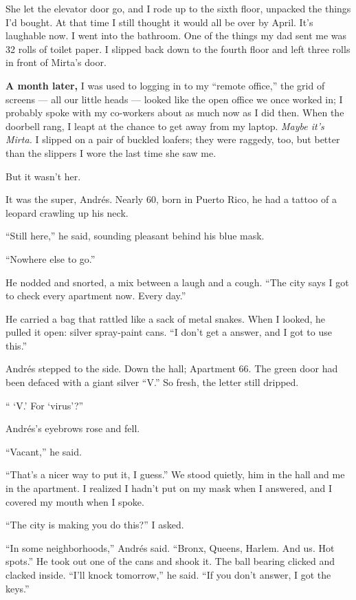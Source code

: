 She let the elevator door go, and I rode up to the sixth floor, unpacked
the things I'd bought. At that time I still thought it would all be over
by April. It's laughable now. I went into the bathroom. One of the
things my dad sent me was 32 rolls of toilet paper. I slipped back down
to the fourth floor and left three rolls in front of Mirta's door.

\textbf{A month later,} I was used to logging in to my ``remote
office,'' the grid of screens --- all our little heads --- looked like
the open office we once worked in; I probably spoke with my co-workers
about as much now as I did then. When the doorbell rang, I leapt at the
chance to get away from my laptop. \emph{Maybe it's Mirta.} I slipped on
a pair of buckled loafers; they were raggedy, too, but better than the
slippers I wore the last time she saw me.

But it wasn't her.

It was the super, Andrés. Nearly 60, born in Puerto Rico, he had a
tattoo of a leopard crawling up his neck.

``Still here,'' he said, sounding pleasant behind his blue mask.

``Nowhere else to go.''

He nodded and snorted, a mix between a laugh and a cough. ``The city
says I got to check every apartment now. Every day.''

He carried a bag that rattled like a sack of metal snakes. When I
looked, he pulled it open: silver spray-paint cans. ``I don't get a
answer, and I got to use this.''

Andrés stepped to the side. Down the hall; Apartment 66. The green door
had been defaced with a giant silver ``V.'' So fresh, the letter still
dripped.

`` `V.' For `virus'?''

Andrés's eyebrows rose and fell.

``Vacant,'' he said.

``That's a nicer way to put it, I guess.'' We stood quietly, him in the
hall and me in the apartment. I realized I hadn't put on my mask when I
answered, and I covered my mouth when I spoke.

``The city is making you do this?'' I asked.

``In some neighborhoods,'' Andrés said. ``Bronx, Queens, Harlem. And us.
Hot spots.'' He took out one of the cans and shook it. The ball bearing
clicked and clacked inside. ``I'll knock tomorrow,'' he said. ``If you
don't answer, I got the keys.''

